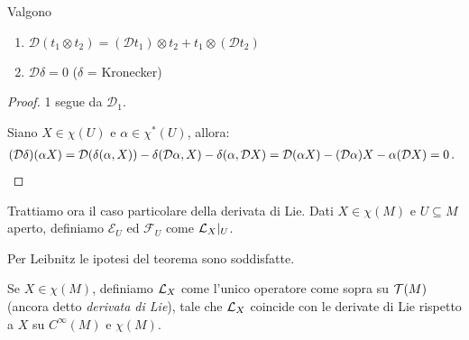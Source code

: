 \begin{corollary}
	Valgono
	\begin{enumerate}
		\item $\mathcal D(t_1\otimes t_2) = (\mathcal D t_1) \otimes t_2 + t_1\otimes (\mathcal D t_2)$
		\item $\mathcal D\delta = 0$ ($\delta$ = Kronecker)
	\end{enumerate}
\end{corollary}
\begin{proof}
	1 segue da $\mathcal D_1$.
	
	Siano $X\in\chi(U)$ e $\alpha\in\chi^*(U)$, allora: 
	\begin{align*}
	(\mathcal D\delta)(\alpha X) = \mathcal D(\delta(\alpha,X)) - \delta(\mathcal D\alpha,X) - \delta(\alpha,\mathcal D X) = \mathcal D (\alpha X) - (\mathcal D\alpha)X - \alpha(\mathcal DX) = 0\punto %
	\end{align*}
\end{proof}

Trattiamo ora il caso particolare della derivata di Lie.
Dati $X\in\chi(M)$ e $U\subseteq M$ aperto, definiamo $\mathcal E_U$ ed $\mathcal F_U$ come $\mathcal L_X|_ U$.

Per Leibnitz le ipotesi del teorema sono soddisfatte.

\begin{definition}
	Se $X\in\chi(M)$, definiamo $\mathcal L_X$ come l'unico operatore come sopra su $\mathcal T(M)$ (ancora detto \emph{derivata di Lie}), tale che $\mathcal L_X$ coincide con le derivate di Lie rispetto a $X$ su $C^\infty(M)$ e $\chi(M)$.
\end{definition}

